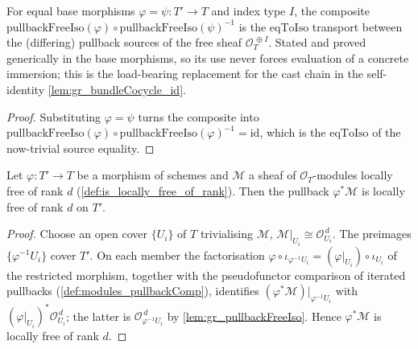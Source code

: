 \begin{lemma}

  \label{lem:gr_pullbackFreeIso_trans_symm_eqToIso}
  For equal base morphisms \(\varphi = \psi : T' \to T\) and index type \(I\), the composite
  \(\mathrm{pullbackFreeIso}(\varphi) \circ \mathrm{pullbackFreeIso}(\psi)^{-1}\) is the
  \(\mathrm{eqToIso}\) transport between the (differing) pullback sources of the free sheaf
  \(\mathcal{O}_T^{\,\oplus I}\). Stated and proved generically in the base morphisms, so its
  use never forces evaluation of a concrete immersion; this is the load-bearing replacement
  for the cast chain in the self-identity \cref{lem:gr_bundleCocycle_id}.
\end{lemma}
\begin{proof}
  \leanok
  Substituting \(\varphi = \psi\) turns the composite into
  \(\mathrm{pullbackFreeIso}(\varphi) \circ \mathrm{pullbackFreeIso}(\varphi)^{-1} =
  \mathrm{id}\), which is the \(\mathrm{eqToIso}\) of the now-trivial source equality.
\end{proof}

\begin{lemma}
  \label{lem:gr_pullback_isLocallyFreeOfRank}
  Let \(\varphi : T' \to T\) be a morphism of schemes and \(\mathcal{M}\) a sheaf of
  \(\mathcal{O}_T\)-modules locally free of rank \(d\)
  (\cref{def:is_locally_free_of_rank}). Then the pullback \(\varphi^{*}\mathcal{M}\) is
  locally free of rank \(d\) on \(T'\).
\end{lemma}

\begin{proof}
  \leanok
  Choose an open cover \(\{U_i\}\) of \(T\) trivialising \(\mathcal{M}\),
  \(\mathcal{M}|_{U_i} \cong \mathcal{O}_{U_i}^{\,d}\). The preimages
  \(\{\varphi^{-1}U_i\}\) cover \(T'\). On each member the factorisation
  \(\varphi \circ \iota_{\varphi^{-1}U_i} = (\varphi|_{U_i}) \circ \iota_{U_i}\) of the
  restricted morphism, together with the pseudofunctor comparison of iterated pullbacks
  (\cref{def:modules_pullbackComp}), identifies
  \((\varphi^{*}\mathcal{M})|_{\varphi^{-1}U_i}\) with
  \((\varphi|_{U_i})^{*}\mathcal{O}_{U_i}^{\,d}\); the latter is
  \(\mathcal{O}_{\varphi^{-1}U_i}^{\,d}\) by \cref{lem:gr_pullbackFreeIso}. Hence
  \(\varphi^{*}\mathcal{M}\) is locally free of rank \(d\).
\end{proof}

